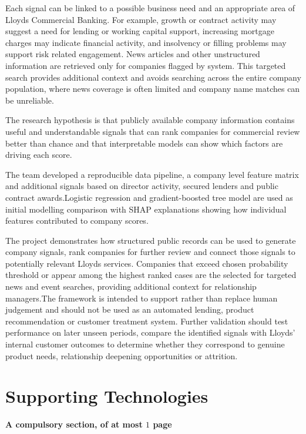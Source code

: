 \documentclass[ %
                    author={Daniel Page},
                supervisor={Dr. Andrew Calway},
                    degree={MSc},
                     title={Some Structural Guidelines for Data Science MSc Theses, Including Those With Long Titles that Run Across Multiple Lines on the Front Page},
                  subtitle={And those including an optional subtitle too, for good measure},
                      type={},
                      year={2021}]{dissertation}
\begin{document}
Each signal can be linked to a possible business need and an appropriate area of Lloyds Commercial Banking. For example, growth or contract activity may suggest a need for lending or working capital support, increasing mortgage charges may indicate financial activity, and insolvency or filling problems may support risk related engagement. News articles and other unstructured information are retrieved only for companies flagged by system. This targeted search provides additional context  and avoids searching across the entire company population, where news coverage is often limited and company name matches can be unreliable.

The research hypothesis is that publicly available company information contains useful and understandable signals that can rank companies for commercial review better than chance and that interpretable models can show which factors are driving each score.

The team developed a reproducible data pipeline, a company level feature matrix and additional signals based on director activity, secured lenders and public contract awards.Logistic regression and gradient-boosted tree model are used as initial modelling comparison with SHAP explanations showing how individual features contributed to company scores.

The project demonstrates how structured public records can be used to generate company signals, rank companies for further review and connect those signals to potentially relevant Lloyds services. Companies that exceed chosen probability threshold or appear among the highest ranked cases are the selected for targeted news and event searches, providing additional context for relationship managers.The framework is intended to support rather than replace human judgement and should not be used as an automated lending, product recommendation or customer treatment system. Further validation should test performance on later unseen periods, compare the identified signals with Lloyds' internal customer outcomes to determine whether they correspond to genuine product needs, relationship deepening opportunities or attrition.


\chapter*{Supporting Technologies}

{\bf A compulsory section, of at most $1$ page}
\vspace{1cm} 
\end{document}
